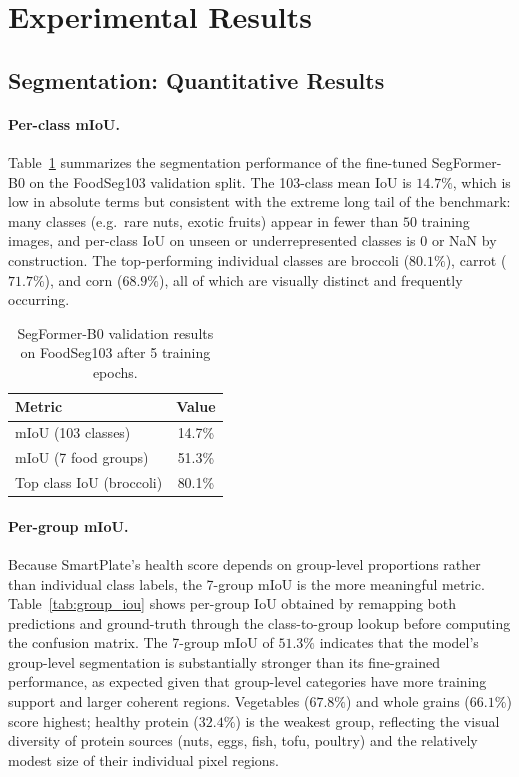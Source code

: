 \section{Experimental Results}
\label{sec:exp}

\subsection{Segmentation: Quantitative Results}

\paragraph{Per-class mIoU.}
Table~\ref{tab:seg_results} summarizes the segmentation performance of the fine-tuned SegFormer-B0 on the FoodSeg103 validation split.
The 103-class mean IoU is $14.7\%$, which is low in absolute terms but consistent with the extreme long tail of the benchmark: many classes (e.g.\ rare nuts, exotic fruits) appear in fewer than $50$ training images, and per-class IoU on unseen or underrepresented classes is $0$ or NaN by construction.
The top-performing individual classes are broccoli ($80.1\%$), carrot ($71.7\%$), and corn ($68.9\%$), all of which are visually distinct and frequently occurring.

\begin{table}[h]
\centering
\caption{SegFormer-B0 validation results on FoodSeg103 after 5 training epochs.}
\label{tab:seg_results}
\begin{tabular}{lc}
\toprule
Metric & Value \\
\midrule
mIoU (103 classes) & 14.7\% \\
mIoU (7 food groups) & 51.3\% \\
Top class IoU (broccoli) & 80.1\% \\
\bottomrule
\end{tabular}
\end{table}

\paragraph{Per-group mIoU.}
Because SmartPlate's health score depends on group-level proportions rather than individual class labels, the 7-group mIoU is the more meaningful metric.
Table~\ref{tab:group_iou} shows per-group IoU obtained by remapping both predictions and ground-truth through the class-to-group lookup before computing the confusion matrix.
The 7-group mIoU of $51.3\%$ indicates that the model's group-level segmentation is substantially stronger than its fine-grained performance, as expected given that group-level categories have more training support and larger coherent regions.
Vegetables ($67.8\%$) and whole grains ($66.1\%$) score highest; healthy protein ($32.4\%$) is the weakest group, reflecting the visual diversity of protein sources (nuts, eggs, fish, tofu, poultry) and the relatively modest size of their individual pixel regions.


